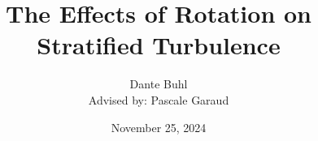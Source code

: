 \documentclass[aspecttatio=169]{beamer}
\title{The Effects of Rotation on Stratified Turbulence}
\author[Dante Buhl]{Dante Buhl \\{\scriptsize Advised by: Pascale Garaud}}
\date{November 25, 2024}
\institute{UCSC Applied Mathematics}
\begin{document}
\newcommand{\wrms}{w_{\text{rms}}}
\newcommand{\bs}[1]{\boldsymbol{#1}}
\newcommand{\tb}[1]{\textbf{#1}}
\newcommand{\bmp}[1]{\begin{minipage}{#1\textwidth}}
\newcommand{\emp}{\end{minipage}}
\newcommand{\R}{\mathbb{R}}
\newcommand{\C}{\mathbb{C}}
\newcommand{\N}{\mathcal{N}}
\newcommand{\K}{\bs{\mathrm{K}}}
\newcommand{\m}{\bs{\mu}_*}
\newcommand{\s}{\bs{\Sigma}_*}
\newcommand{\dt}{\Delta t}
\newcommand{\dx}{\Delta x}
\newcommand{\tr}[1]{\text{Tr}(#1)}
\newcommand{\Tr}[1]{\text{Tr}(#1)}
\newcommand{\Div}{\nabla \cdot}
\renewcommand{\div}{\nabla \cdot}
\newcommand{\Curl}{\nabla \times}
\newcommand{\Grad}{\nabla}
\newcommand{\grad}{\nabla}
\newcommand{\grads}{\nabla_s}
\newcommand{\gradf}{\nabla_f}
\newcommand{\xs}{\bs{x}_s}
\newcommand{\xf}{\bs{x}_f}
\newcommand{\ts}{t_s}
\newcommand{\tf}{t_f}
\newcommand{\pt}{\partial t}
\newcommand{\pz}{\partial z}
\newcommand{\uvec}{\bs{u}}
\newcommand{\F}{\bs{F}}
\newcommand{\T}{\tilde{T}}
\newcommand{\ez}{\bs{e}_z}
\newcommand{\ex}{\bs{e}_x}
\newcommand{\ey}{\bs{e}_y}
\newcommand{\eo}{\bs{e}_{\bs{\Omega}}}
\newcommand{\ppt}[1]{\frac{\partial #1}{\partial t}}
\newcommand{\ppts}[1]{\frac{\partial #1}{\partial t_s}}
\newcommand{\pptf}[1]{\frac{\partial #1}{\partial t_f}}
\newcommand{\ppz}[1]{\frac{\partial #1}{\partial z}}
\newcommand{\ddz}[1]{\frac{d #1}{d z}}
\newcommand{\ppzetas}[1]{\frac{\partial^2 #1}{\partial \zeta^2}}
\newcommand{\ppzs}[1]{\frac{\partial #1}{\partial z_s}}
\newcommand{\ppzf}[1]{\frac{\partial #1}{\partial z_f}}
\newcommand{\ppx}[1]{\frac{\partial #1}{\partial x}}
\newcommand{\ppy}[1]{\frac{\partial #1}{\partial y}}
\newcommand{\ppzeta}[1]{\frac{\partial #1}{\partial \zeta}}

\frame{\titlepage}
\end{document}
